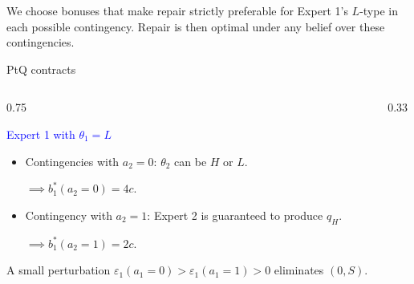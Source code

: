 \documentclass[10pt,aspectratio=169, compressed]{beamer}
\begin{document}
\medskip

We choose bonuses that make repair strictly preferable for Expert 1's $L$-type in each possible contingency. Repair is then optimal under any belief over these contingencies.

\fi






\begin{frame}[t]{PtQ contracts}

\begin{columns}[T,onlytextwidth]
    \begin{column}{0.75\textwidth}
    
\textcolor{blue}{Expert 1 with $\theta_1 = L$}
    
    \smallskip 
    
    \begin{itemize}
\item Contingencies with $a_2 = 0$: $\theta_2$ can be $H$ or $L$.
\smallskip

  $ \implies b_1^*(a_2 \!=\! 0) = 4c$.

\item
Contingency with $a_2=1$: Expert 2 is guaranteed to produce $q_H$.

\smallskip

  $ \implies b_1^*(a_2 \!=\! 1) = 2c$.
    \end{itemize}
    
    \medskip

A small perturbation {\small $\varepsilon_1(a_1\!=\!0) > \varepsilon_1(a_1\!=\!1) > 0$}
eliminates $(0,S)$.

\bigskip


 
    \end{column}

    \begin{column}{0.33\textwidth}
        \centering
        \setlength{\tabcolsep}{8pt}
        \renewcommand{\arraystretch}{1.2}
\\[5pt]
\\[15pt]


\end{column}
\end{columns}
\end{frame}
\end{document}
